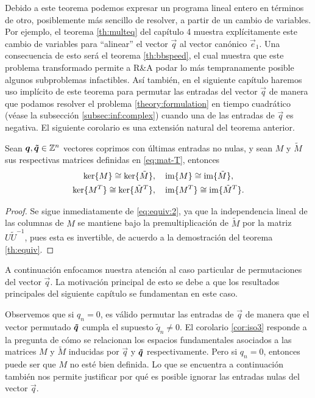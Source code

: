 Debido a este teorema podemos expresar un programa lineal entero en términos de otro, posiblemente
más sencillo de resolver, a partir de un cambio de variables. Por ejemplo, el teorema
\ref{th:multeq} del capítulo 4 muestra explícitamente este cambio de variables para ``alinear'' el
vector $\vec{q}$ al vector canónico $\vec{e}_1$. Una consecuencia de esto será el teorema
\ref{th:bbspeed}, el cual muestra que este problema transformado permite a R\&A
podar lo más tempranamente posible algunos subproblemas infactibles. Así también, en el siguiente
capítulo haremos uso implícito de este teorema para permutar las entradas del vector $\vec{q}$ de
manera que podamos resolver el problema \ref{theory:formulation} en tiempo cuadrático (véase la
subsección \ref{subsec:inf:complex}) cuando una de las entradas de $\vec{q}$ es negativa. El
siguiente corolario es una extensión natural del teorema anterior.

\begin{corollary}
	\label{cor:iso3}
	Sean $\boldsymbol{q}, \boldsymbol{\tilde{q}} \in \mathbb{Z}^n$ vectores coprimos con últimas entradas no nulas, y
	sean $M$ y $\tilde{M}$ sus respectivas matrices definidas en \eqref{eq:mat-T}, entonces
	\begin{align*}
		\operatorname{ker}\lbrace M \rbrace \cong \operatorname{ker}\lbrace \tilde{M} \rbrace, &\quad
		\operatorname{im}\lbrace M \rbrace \cong \operatorname{im}\lbrace \tilde{M} \rbrace, \\
		\operatorname{ker}\lbrace M^T \rbrace \cong \operatorname{ker}\lbrace \tilde{M}^T \rbrace, &\quad
		\operatorname{im}\lbrace M^T \rbrace \cong \operatorname{im}\lbrace \tilde{M}^T \rbrace.
	\end{align*}
\end{corollary}
\begin{proof}
	Se sigue inmediatamente de \eqref{eq:equiv:2}, ya que la independencia lineal de las columnas de
	$M$ se mantiene bajo la premultiplicación de $\tilde{M}$ por la matriz $U\tilde{U}^{-1}$, pues
	esta es invertible, de acuerdo a la demostración del teorema \ref{th:equiv}.
\end{proof}

A continuación enfocamos nuestra atención al caso particular de permutaciones del vector $\vec{q}$.
La motivación principal de esto se debe a que los resultados principales del siguiente capítulo se
fundamentan en este caso.

Observemos que si $q_n = 0$, es válido permutar las entradas de $\vec{q}$ de manera que el vector
permutado $\boldsymbol{\tilde{q}}$ cumpla el supuesto $\tilde{q}_n \neq 0$. El corolario \ref{cor:iso3} responde a
la pregunta de cómo se relacionan los espacios fundamentales asociados a las matrices $M$ y
$\tilde{M}$ inducidas por $\vec{q}$ y $\boldsymbol{\tilde{q}}$ respectivamente. Pero si $q_n = 0$, entonces puede
ser que $M$ no esté bien definida. Lo que se encuentra a continuación también nos permite justificar
por qué es posible ignorar las entradas nulas del vector $\vec{q}$.

